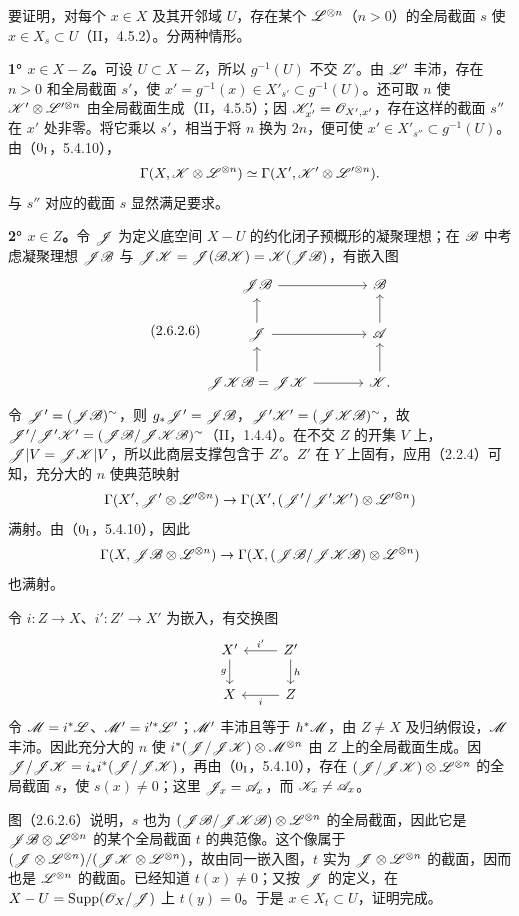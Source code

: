 要证明，对每个 $x\in X$ 及其开邻域 $U$，存在某个 $\mathscr L^{\otimes n}$（$n>0$）的全局截面 $s$ 使 $x\in X_s\subset U$（II，4.5.2）。分两种情形。

\textbf{1° $x\in X-Z$。}可设 $U\subset X-Z$，所以 $g^{-1}(U)$ 不交 $Z'$。由 $\mathscr L'$ 丰沛，存在 $n>0$ 和全局截面 $s'$，使 $x'=g^{-1}(x)\in X'_{s'}\subset g^{-1}(U)$。还可取 $n$ 使 $\mathscr K'\otimes\mathscr L'^{\otimes n}$ 由全局截面生成（II，4.5.5）；因 $\mathscr K'_{x'}=\mathscr O_{X',x'}$，存在这样的截面 $s''$ 在 $x'$ 处非零。将它乘以 $s'$，相当于将 $n$ 换为 $2n$，便可使 $x'\in X'_{s''}\subset g^{-1}(U)$。由（$0_{\mathrm I}$，5.4.10），
\[
\Gamma(X,\mathscr K\otimes\mathscr L^{\otimes n})\simeq\Gamma(X',\mathscr K'\otimes\mathscr L'^{\otimes n}).
\]
与 $s''$ 对应的截面 $s$ 显然满足要求。

\textbf{2° $x\in Z$。}令 $\mathscr J$ 为定义底空间 $X-U$ 的约化闭子预概形的凝聚理想；在 $\mathscr B$ 中考虑凝聚理想 $\mathscr J\mathscr B$ 与 $\mathscr J\mathscr K=\mathscr J(\mathscr B\mathscr K)=\mathscr K(\mathscr J\mathscr B)$，有嵌入图
\begin{equation}\tag{2.6.2.6}
\begin{tikzcd}[column sep=large]
\J\B\arrow[r]&\B\\
\J\arrow[u]\arrow[r]&\A\arrow[u]\\
\J\K\B=\J\K\arrow[u]\arrow[r]&\K\arrow[u].
\end{tikzcd}
\end{equation}
令 $\mathscr J'=(\mathscr J\mathscr B)^\sim$，则 $g_*\mathscr J'=\mathscr J\mathscr B$，$\mathscr J'\mathscr K'=(\mathscr J\mathscr K\mathscr B)^\sim$，故
$\mathscr J'/\mathscr J'\mathscr K'=(\mathscr J\mathscr B/\mathscr J\mathscr K\mathscr B)^\sim$（II，1.4.4）。在不交 $Z$ 的开集 $V$ 上，$\mathscr J|V=\mathscr J\mathscr K|V$，所以此商层支撑包含于 $Z'$。$Z'$ 在 $Y$ 上固有，应用（2.2.4）可知，充分大的 $n$ 使典范映射
\[
\Gamma(X',\mathscr J'\otimes\mathscr L'^{\otimes n})\to
\Gamma(X',(\mathscr J'/\mathscr J'\mathscr K')\otimes\mathscr L'^{\otimes n})
\]
满射。由（$0_{\mathrm I}$，5.4.10），因此
\[
\Gamma(X,\mathscr J\mathscr B\otimes\mathscr L^{\otimes n})\to
\Gamma(X,(\mathscr J\mathscr B/\mathscr J\mathscr K\mathscr B)\otimes\mathscr L^{\otimes n})
\]
也满射。

令 $i:Z\to X$、$i':Z'\to X'$ 为嵌入，有交换图
\[
\begin{tikzcd}
X'\arrow[d,"g"']&Z'\arrow[l,"i'"']\arrow[d,"h"]\\
X&Z\arrow[l,"i"]
\end{tikzcd}
\]
令 $\mathscr M=i^*\mathscr L$、$\mathscr M'=i'^*\mathscr L'$；$\mathscr M'$ 丰沛且等于 $h^*\mathscr M$，由 $Z\ne X$ 及归纳假设，$\mathscr M$ 丰沛。因此充分大的 $n$ 使 $i^*(\mathscr J/\mathscr J\mathscr K)\otimes\mathscr M^{\otimes n}$ 由 $Z$ 上的全局截面生成。因 $\mathscr J/\mathscr J\mathscr K=i_*i^*(\mathscr J/\mathscr J\mathscr K)$，再由（$0_{\mathrm I}$，5.4.10），存在 $(\mathscr J/\mathscr J\mathscr K)\otimes\mathscr L^{\otimes n}$ 的全局截面 $s$，使 $s(x)\ne0$；这里 $\mathscr J_x=\mathscr A_x$，而 $\mathscr K_x\ne\mathscr A_x$。

图（2.6.2.6）说明，$s$ 也为 $(\mathscr J\mathscr B/\mathscr J\mathscr K\mathscr B)\otimes\mathscr L^{\otimes n}$ 的全局截面，因此它是 $\mathscr J\mathscr B\otimes\mathscr L^{\otimes n}$ 的某个全局截面 $t$ 的典范像。这个像属于 $(\mathscr J\otimes\mathscr L^{\otimes n})/(\mathscr J\mathscr K\otimes\mathscr L^{\otimes n})$，故由同一嵌入图，$t$ 实为 $\mathscr J\otimes\mathscr L^{\otimes n}$ 的截面，因而也是 $\mathscr L^{\otimes n}$ 的截面。已经知道 $t(x)\ne0$；又按 $\mathscr J$ 的定义，在 $X-U=\operatorname{Supp}(\mathscr O_X/\mathscr J)$ 上 $t(y)=0$。于是 $x\in X_t\subset U$，证明完成。\finishproof

